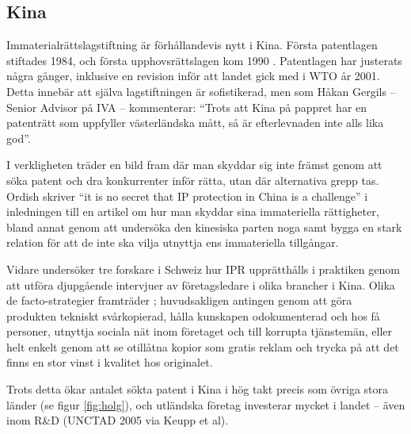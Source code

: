 
\subsection{Kina}

Immaterialrättslagstiftning är förhållandevis nytt i Kina. Första patentlagen stiftades 1984, och första upphovsrättslagen kom 1990 \cite{gergils}. Patentlagen har justerats några gånger, inklusive en revision inför att landet gick med i WTO år 2001. Detta innebär att själva lagstiftningen är sofistikerad, men som Håkan Gergils -- Senior Advisor på IVA -- kommenterar: ``Trots att Kina på pappret har en patenträtt som uppfyller västerländska mått, så är 
efterlevnaden inte alls lika god''.

I verkligheten träder en bild fram där man skyddar sig inte främst genom att söka patent och dra konkurrenter inför rätta, utan där alternativa grepp tas. Ordish skriver ``it is no secret that IP protection in China is a challenge'' \cite{ordish} i inledningen till en artikel om hur man skyddar sina immateriella rättigheter, bland annat genom att undersöka den kinesiska parten noga samt bygga en stark relation för att de inte ska vilja utnyttja ens immateriella tillgångar.

Vidare undersöker tre forskare i Schweiz hur IPR upprätthålls i praktiken genom att utföra djupgående intervjuer av företagsledare i olika brancher i Kina. Olika de facto-strategier framträder \cite{keupp}; huvudsakligen antingen genom att göra produkten tekniskt svårkopierad, hålla kunskapen odokumenterad och hos få personer, utnyttja sociala nät inom företaget och till korrupta tjänstemän, eller helt enkelt genom att se otillåtna kopior som gratis reklam och trycka på att det finns en stor vinst i kvalitet hos originalet.

Trots detta ökar antalet sökta patent i Kina i hög takt precis som övriga stora länder (se figur \ref{fig:holg}), och utländska företag investerar mycket i landet -- även inom R\&D (UNCTAD 2005 via Keupp et al).
